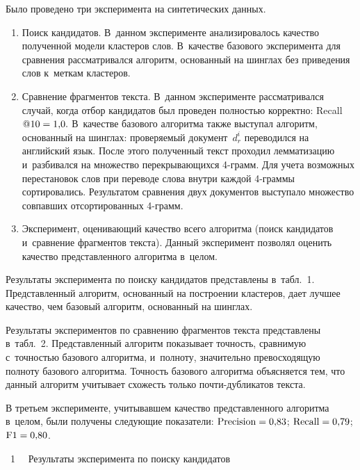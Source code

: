 \begin{multicols}{2}
Было проведено три эксперимента на синтетических данных.
\begin{enumerate}
\item Поиск кандидатов. В~данном эксперименте анализировалось  качество 
полученной модели кластеров слов. В~качестве базового эксперимента для сравнения 
рассматривался алгоритм, основанный на шинглах без приведения слов к~меткам 
кластеров.
\item Сравнение фрагментов текста. В~данном эксперименте рассматривался случай, 
когда отбор кандидатов был проведен полностью корректно: Recall$@10\hm=1{,}0.$ 
В~качестве базового алгоритма также выступал алгоритм, основанный на шинглах: 
проверяемый документ~$d_r^i$ переводился на английский язык. После этого 
полученный текст проходил лемматизацию и~разбивался на множество перекрывающихся 
4-грамм.
Для учета возможных перестановок слов при переводе слова внутри каждой 4-грам\-мы сортировались. 
Результатом сравнения двух документов выступало множество 
совпавших отсортированных 4-грамм.

\item Эксперимент, оценивающий качество всего алгоритма (поиск кандидатов 
и~сравнение фрагментов текста). Данный эксперимент позволял оценить качество 
представленного алгоритма в~целом.
\end{enumerate}

Результаты эксперимента по поиску кандидатов представлены в~табл.~1.
Представленный алгоритм, основанный на построении кластеров, дает лучшее 
качество, чем базовый алгоритм, основанный на шинглах.



Результаты экспериментов по сравнению фрагментов текста представлены 
в~табл.~2. Пред\-став\-лен\-ный алгоритм показывает точ\-ность, 
сравнимую с~точностью базового алгоритма, и~полноту, значительно превосходящую 
полноту базового алгоритма. Точ\-ность базового алгоритма объясняется тем, что 
данный алгоритм учитывает схожесть только поч\-ти-дуб\-ли\-ка\-тов текста.




В третьем эксперименте, учитывавшем качество представленного алгоритма в~целом, 
были получены следующие показатели: $\mbox{Precision}\hm=0{,}83$; 
$\mbox{Recall}\hm=0{,}79$; $\mbox{F1}\hm=0{,}80$.

\begin{center}
\noindent
\parbox{138pt}{{{\tablename~1}\ \ \small{
Результаты эксперимента по поиску кандидатов
}}}


\end{center}
\end{multicols}

